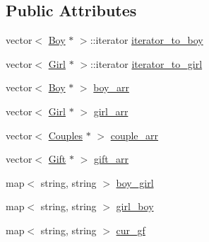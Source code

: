 \subsection*{Public Attributes}
\begin{DoxyCompactItemize}
\item 
vector$<$ \hyperlink{class_boy}{Boy} $\ast$ $>$\-::iterator \hyperlink{classq8_aee64e9b768b3d8a13db1814a8b443101}{iterator\-\_\-to\-\_\-boy}
\item 
vector$<$ \hyperlink{class_girl}{Girl} $\ast$ $>$\-::iterator \hyperlink{classq8_a904461d8b367f53e23c7e865ef1996b3}{iterator\-\_\-to\-\_\-girl}
\item 
vector$<$ \hyperlink{class_boy}{Boy} $\ast$ $>$ \hyperlink{classq8_a228f7527b4439cddc5a64a61e147460e}{boy\-\_\-arr}
\item 
vector$<$ \hyperlink{class_girl}{Girl} $\ast$ $>$ \hyperlink{classq8_aa44ab411ff58c8aa24f34c7bf4cabef2}{girl\-\_\-arr}
\item 
vector$<$ \hyperlink{class_couples}{Couples} $\ast$ $>$ \hyperlink{classq8_a37dccb28c06ce007f4268607a560d801}{couple\-\_\-arr}
\item 
vector$<$ \hyperlink{class_gift}{Gift} $\ast$ $>$ \hyperlink{classq8_a43951e1c68f6e733dab7bc7d6a4becbb}{gift\-\_\-arr}
\item 
map$<$ string, string $>$ \hyperlink{classq8_acbc59387f21252d37d63af51345c6ec2}{boy\-\_\-girl}
\item 
map$<$ string, string $>$ \hyperlink{classq8_a4e1918da4953e5cd1f037982dacc9a4e}{girl\-\_\-boy}
\item 
map$<$ string, string $>$ \hyperlink{classq8_a7b6a9accc8ffe9b590c49e5f4acca483}{cur\-\_\-gf}
\end{DoxyCompactItemize}


